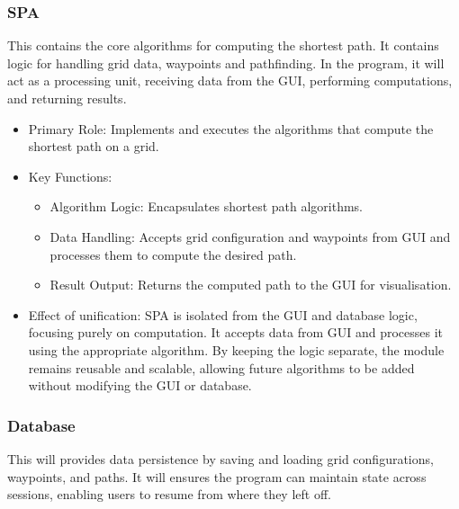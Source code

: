 \newpage

\subsubsection{SPA}
This contains the core algorithms for computing the shortest path. It contains logic for handling grid data, waypoints and pathfinding. In the program, it will act as a processing unit, receiving data from the GUI, performing computations, and returning results.

\begin{itemize}
    \item Primary Role: Implements and executes the algorithms that compute the shortest path on a grid.
    \item Key Functions:
        \begin{itemize}
            \item Algorithm Logic: Encapsulates shortest path algorithms.
            \item Data Handling: Accepts grid configuration and waypoints from GUI and processes them to compute the desired path.
            \item Result Output: Returns the computed path to the GUI for visualisation.
        \end{itemize}
    \item Effect of unification: \newline
        SPA is isolated from the GUI and database logic, focusing purely on computation. It accepts data from GUI and processes it using the appropriate algorithm. By keeping the logic separate, the module remains reusable and scalable, allowing future algorithms to be added without modifying the GUI or database.
\end{itemize}



\subsubsection{Database}
This will provides data persistence by saving and loading grid configurations, waypoints, and paths. It will ensures the program can maintain state across sessions, enabling users to resume from where they left off.

